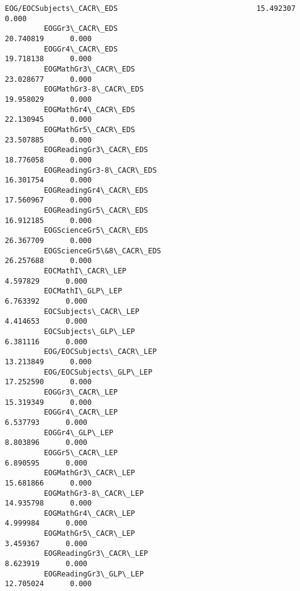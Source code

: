 \documentclass[11pt]{article}
\begin{document}
\begin{Verbatim}[commandchars=\\\{\}]
         EOG/EOCSubjects\_CACR\_EDS                                15.492307      0.000   
         EOGGr3\_CACR\_EDS                                         20.740819      0.000   
         EOGGr4\_CACR\_EDS                                         19.718138      0.000   
         EOGMathGr3\_CACR\_EDS                                     23.028677      0.000   
         EOGMathGr3-8\_CACR\_EDS                                   19.958029      0.000   
         EOGMathGr4\_CACR\_EDS                                     22.130945      0.000   
         EOGMathGr5\_CACR\_EDS                                     23.507885      0.000   
         EOGReadingGr3\_CACR\_EDS                                  18.776058      0.000   
         EOGReadingGr3-8\_CACR\_EDS                                16.301754      0.000   
         EOGReadingGr4\_CACR\_EDS                                  17.560967      0.000   
         EOGReadingGr5\_CACR\_EDS                                  16.912185      0.000   
         EOGScienceGr5\_CACR\_EDS                                  26.367709      0.000   
         EOGScienceGr5\&8\_CACR\_EDS                                26.257688      0.000   
         EOCMathI\_CACR\_LEP                                        4.597829      0.000   
         EOCMathI\_GLP\_LEP                                         6.763392      0.000   
         EOCSubjects\_CACR\_LEP                                     4.414653      0.000   
         EOCSubjects\_GLP\_LEP                                      6.381116      0.000   
         EOG/EOCSubjects\_CACR\_LEP                                13.213849      0.000   
         EOG/EOCSubjects\_GLP\_LEP                                 17.252590      0.000   
         EOGGr3\_CACR\_LEP                                         15.319349      0.000   
         EOGGr4\_CACR\_LEP                                          6.537793      0.000   
         EOGGr4\_GLP\_LEP                                           8.803896      0.000   
         EOGGr5\_CACR\_LEP                                          6.890595      0.000   
         EOGMathGr3\_CACR\_LEP                                     15.681866      0.000   
         EOGMathGr3-8\_CACR\_LEP                                   14.935798      0.000   
         EOGMathGr4\_CACR\_LEP                                      4.999984      0.000   
         EOGMathGr5\_CACR\_LEP                                      3.459367      0.000   
         EOGReadingGr3\_CACR\_LEP                                   8.623919      0.000   
         EOGReadingGr3\_GLP\_LEP                                   12.705024      0.000   

\end{Verbatim}
\end{document}
